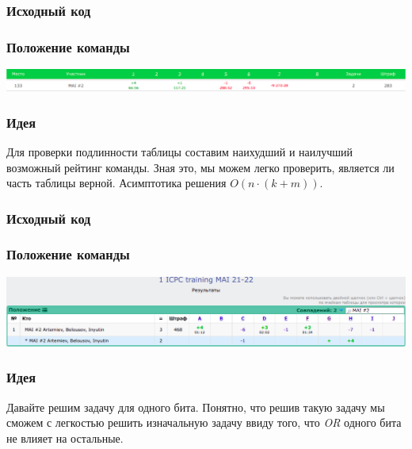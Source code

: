 \documentclass[12pt]{article}
\begin{document}
\subsubsection*{Исходный код}

\subsubsection*{Положение команды}
\includegraphics[scale=0.25]{images/sib.png}\newline\noindent
\pagebreak


\subsubsection*{Идея}
Для проверки подлинности таблицы составим наихудший и наилучший возможный рейтинг команды. Зная это, мы можем легко проверить, является ли часть таблицы верной. Асимптотика решения $O(n \cdot (k + m))$.

\subsubsection*{Исходный код}

\subsubsection*{Положение команды}
\includegraphics[scale=0.25]{images/training1mai21.png}\newline\noindent
\pagebreak


\subsubsection*{Идея}
Давайте решим задачу для одного бита. Понятно, что решив такую задачу мы сможем с легкостью решить изначальную задачу ввиду того, что \textit{OR} одного бита не влияет на остальные.
\end{document}
